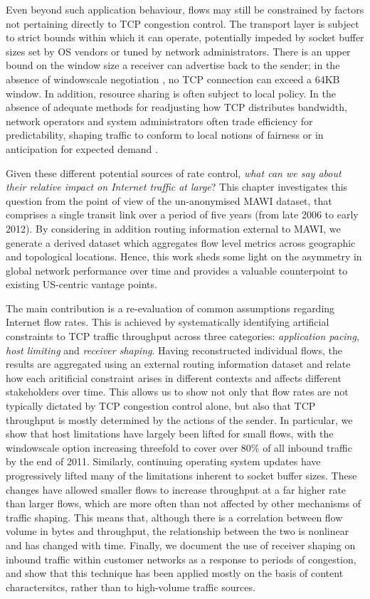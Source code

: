 Even beyond such application behaviour, flows may still be constrained by factors not pertaining directly to TCP congestion control.
The transport layer is subject to strict bounds within which it can operate, potentially impeded by socket buffer sizes set by OS vendors or tuned by network administrators. There is an upper bound on the window size a receiver can advertise back to the sender; in the absence of windowscale negotiation \cite{braden1989rfc}, no TCP connection can exceed a 64KB window. In addition, resource sharing is often subject to local policy.
In the absence of adequate methods for readjusting how TCP distributes bandwidth, network operators and system administrators often trade efficiency for predictability, shaping traffic to conform to local notions of fairness or in anticipation for expected demand \cite{ispTrafficShaping}.

Given these different potential sources of rate control, \emph{what can we say about their relative impact on Internet traffic at large}?
This chapter investigates this question from the point of view of the un-anonymised MAWI dataset, that comprises a single transit link over a period of five years (from late 2006 to early 2012). By considering in addition routing information external to MAWI, we generate a derived dataset which aggregates flow level metrics across geographic and topological locations. Hence, this work sheds some light on the asymmetry in global network performance over time and provides a valuable counterpoint to existing US-centric vantage points.

The main contribution is a re-evaluation of common assumptions regarding Internet flow rates. This is achieved by systematically identifying artificial constraints to TCP traffic throughput across three categories: \emph{application pacing}, \emph{host limiting} and \emph{receiver shaping}. 
Having reconstructed individual flows, the results are aggregated using an external routing information dataset and relate how each aritificial constraint arises in different contexts and affects different stakeholders over time. This allows us to show not only that flow rates are not typically dictated by TCP congestion control alone, but also that TCP throughput is mostly determined by the actions of the sender. In particular, we show that host limitations have largely been lifted for small flows, with the windowscale option increasing threefold to cover over 80\% of all inbound traffic by the end of 2011. 
Similarly, continuing operating system updates have progressively lifted many of the limitations inherent to socket buffer sizes. These changes have allowed smaller flows to increase throughput at a far higher rate than larger flows, which are more often than not affected by other mechanisms of traffic shaping.
This means that, although there is a correlation between flow volume in bytes and throughput, the relationship between the two is nonlinear and has changed with time.
Finally, we document the use of receiver shaping on inbound traffic within customer networks as a response to periods of congestion, and show that this technique has been applied mostly on the basis of content charactersitcs, rather than to high-volume traffic sources. 

